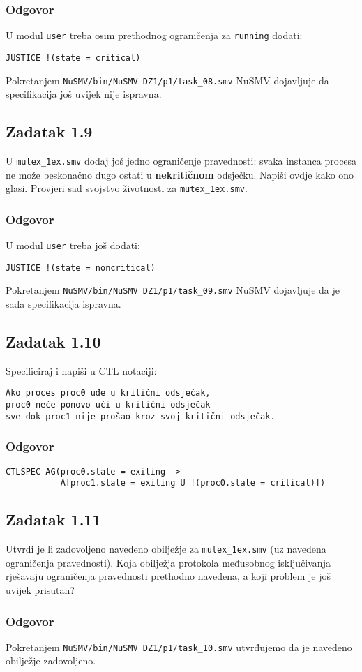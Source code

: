 \documentclass{article}
\newcommand{\code}[1]{\colorbox{blue!15}{\texttt{#1}}}
\newcommand{\odgovor}{\subsubsection*{Odgovor}}
\newcommand{\zadatak}[1]{\subsection{Zadatak #1}}
\begin{document}
\odgovor

U modul \code{user} treba osim prethodnog ograničenja za \code{running} dodati:

\begin{verbatim}
JUSTICE !(state = critical)
\end{verbatim}

\noindent
Pokretanjem \code{NuSMV/bin/NuSMV DZ1/p1/task\_08.smv} NuSMV dojavljuje da specifikacija još uvijek nije ispravna.


\zadatak{1.9}

U \code{mutex\_1ex.smv} dodaj još jedno ograničenje pravednosti: svaka instanca procesa ne može beskonačno dugo ostati u \textbf{nekritičnom} odsječku. Napiši ovdje kako ono glasi. Provjeri sad svojstvo životnosti za \code{mutex\_1ex.smv}.

\odgovor

U modul \code{user} treba još dodati:

\begin{verbatim}
JUSTICE !(state = noncritical)
\end{verbatim}

\noindent
Pokretanjem \code{NuSMV/bin/NuSMV DZ1/p1/task\_09.smv} NuSMV dojavljuje da je sada specifikacija ispravna.
\pagebreak  %


\zadatak{1.10}

Specificiraj i napiši u CTL notaciji:

\begin{verbatim}
Ako proces proc0 uđe u kritični odsječak,
proc0 neće ponovo ući u kritični odsječak
sve dok proc1 nije prošao kroz svoj kritični odsječak.
\end{verbatim}

\odgovor

\begin{verbatim}
CTLSPEC AG(proc0.state = exiting ->
           A[proc1.state = exiting U !(proc0.state = critical)])
\end{verbatim}


\zadatak{1.11}

Utvrdi je li zadovoljeno navedeno obilježje za \code{mutex\_1ex.smv} (uz navedena ograničenja pravednosti). Koja obilježja protokola međusobnog isključivanja rješavaju ograničenja pravednosti prethodno navedena, a koji problem je još uvijek prisutan?

\odgovor

Pokretanjem \code{NuSMV/bin/NuSMV DZ1/p1/task\_10.smv} utvrđujemo da je navedeno obilježje zadovoljeno.
\newline
\end{document}
